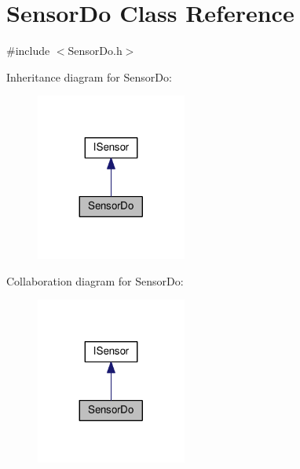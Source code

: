 \hypertarget{class_sensor_do}{}\section{Sensor\+Do Class Reference}
\label{class_sensor_do}


{\ttfamily \#include $<$Sensor\+Do.\+h$>$}



Inheritance diagram for Sensor\+Do\+:\nopagebreak
\begin{figure}[H]
\begin{center}
\leavevmode
\includegraphics[width=140pt]{class_sensor_do__inherit__graph}
\end{center}
\end{figure}


Collaboration diagram for Sensor\+Do\+:\nopagebreak
\begin{figure}[H]
\begin{center}
\leavevmode
\includegraphics[width=140pt]{class_sensor_do__coll__graph}
\end{center}
\end{figure}

